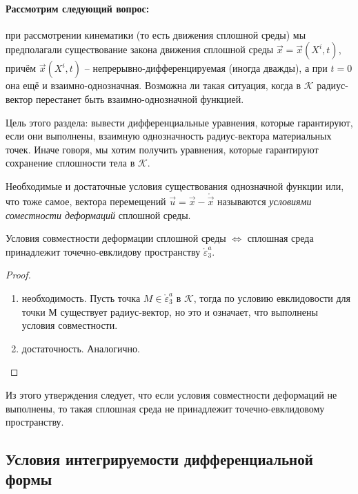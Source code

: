 \paragraph{Рассмотрим следующий вопрос:}
при рассмотрении кинематики (то есть движения сплошной среды)
мы предполагали существование закона движения сплошной среды $\vec{x} = \vec{x} (X^i, t)$, 
причём $\vec{x}(X^i, t)$ -- непрерывно-дифференцируемая (иногда дважды), а при $t=0$ она ещё
и взаимно-однозначная. Возможна ли такая ситуация, когда в $\mathcal{K}$ радиус-вектор
перестанет быть взаимно-однозначной функцией.

Цель этого раздела: вывести дифференциальные уравнения, которые гарантируют, если они
выполнены, взаимную однозначность радиус-вектора материальных точек. Иначе говоря, мы хотим
получить уравнения, которые гарантируют сохранение сплошности тела в $\mathcal{K}$.

\begin{definition}
  Необходимые и достаточные условия существования однозначной функции или, что тоже самое,
  вектора перемещений $\vec{u} = \vec{x} - \mathring{\vec{x}}$ называются
  \emph{условиями соместности деформаций} сплошной среды.
\end{definition}

\begin{utv}
  Условия совместности деформации сплошной среды $\Leftrightarrow$
  сплошная среда принадлежит точечно-евклидову пространству $\mathring{\varepsilon}_3^a$.
\end{utv}
\begin{proof}
  \begin{enumerate}
    \item необходимость. Пусть точка $M \in \mathring{\varepsilon}_3^a$ в $\mathcal{K}$,
      тогда по условию евклидовости для точки М существует радиус-вектор, но это и
      означает, что выполнены условия совместности.
    \item достаточность. Аналогично.
  \end{enumerate}
\end{proof}

Из этого утверждения следует, что если условия совместности деформаций не выполнены, то такая
сплошная среда не принадлежит точечно-евклидовому пространству.



\subsection{Условия интегрируемости дифференциальной формы}

